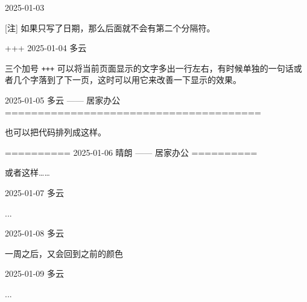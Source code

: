 \documentclass[11pt, paperstyle=light yellow, color entry,
  title in boldface, title in sffamily, use style = classical]{jwjournal}
\begin{document}
2025-01-03

  [注] 如果只写了日期，那么后面就不会有第二个分隔符。


+++
2025-01-04  多云

  三个加号 \texttt{+++} 可以将当前页面显示的文字多出一行左右，有时候单独的一句话或者几个字落到了下一页，这时可以用它来改善一下显示的效果。



2025-01-05    多云        —— 居家办公
=======================================

也可以把代码排列成这样。


==========
2025-01-06    晴朗        —— 居家办公
==========

或者这样……



2025-01-07  多云

  ...



2025-01-08  多云

  一周之后，又会回到之前的颜色



2025-01-09  多云

  ...
\end{document}
